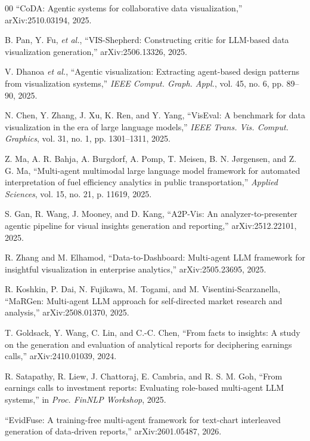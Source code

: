 \documentclass[conference]{IEEEtran}
\begin{document}
\begin{thebibliography}{00}
 ``CoDA: Agentic systems for collaborative data visualization,'' arXiv:2510.03194, 2025.

 B. Pan, Y. Fu, \textit{et al.}, ``VIS-Shepherd: Constructing critic for LLM-based data visualization generation,'' arXiv:2506.13326, 2025.

 V. Dhanoa \textit{et al.}, ``Agentic visualization: Extracting agent-based design patterns from visualization systems,'' \textit{IEEE Comput. Graph. Appl.}, vol. 45, no. 6, pp. 89--90, 2025.

 N. Chen, Y. Zhang, J. Xu, K. Ren, and Y. Yang, ``VisEval: A benchmark for data visualization in the era of large language models,'' \textit{IEEE Trans. Vis. Comput. Graphics}, vol. 31, no. 1, pp. 1301--1311, 2025.

 Z. Ma, A. R. Bahja, A. Burgdorf, A. Pomp, T. Meisen, B. N. J{\o}rgensen, and Z. G. Ma, ``Multi-agent multimodal large language model framework for automated interpretation of fuel efficiency analytics in public transportation,'' \textit{Applied Sciences}, vol. 15, no. 21, p. 11619, 2025.

 S. Gan, R. Wang, J. Mooney, and D. Kang, ``A2P-Vis: An analyzer-to-presenter agentic pipeline for visual insights generation and reporting,'' arXiv:2512.22101, 2025.

 R. Zhang and M. Elhamod, ``Data-to-Dashboard: Multi-agent LLM framework for insightful visualization in enterprise analytics,'' arXiv:2505.23695, 2025.

 R. Koshkin, P. Dai, N. Fujikawa, M. Togami, and M. Visentini-Scarzanella, ``MaRGen: Multi-agent LLM approach for self-directed market research and analysis,'' arXiv:2508.01370, 2025.

 T. Goldsack, Y. Wang, C. Lin, and C.-C. Chen, ``From facts to insights: A study on the generation and evaluation of analytical reports for deciphering earnings calls,'' arXiv:2410.01039, 2024.

 R. Satapathy, R. Liew, J. Chattoraj, E. Cambria, and R. S. M. Goh, ``From earnings calls to investment reports: Evaluating role-based multi-agent LLM systems,'' in \textit{Proc. FinNLP Workshop}, 2025.

 ``EvidFuse: A training-free multi-agent framework for text-chart interleaved generation of data-driven reports,'' arXiv:2601.05487, 2026.


\end{thebibliography}
\end{document}
